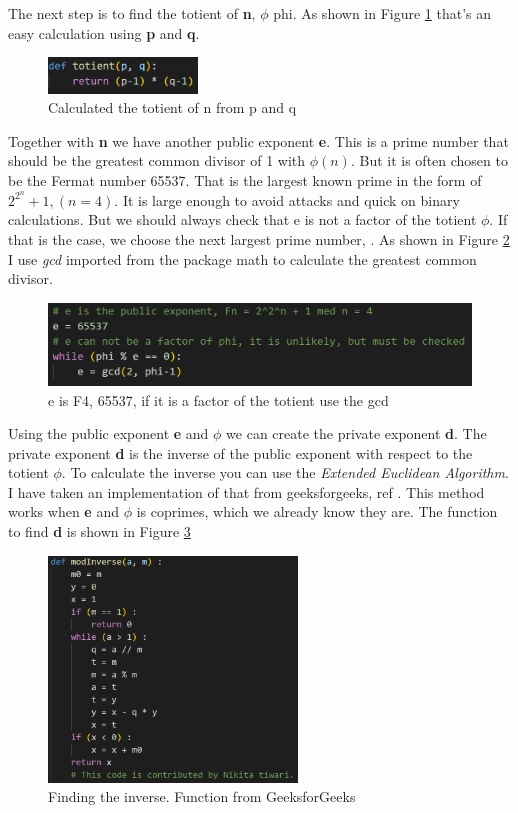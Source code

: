 \documentclass[12pt, letterpaper]{article}
\begin{document}
The next step is to find the totient of \textbf{n}, $\phi$ phi. As shown in Figure \ref{fig:totient} that's an easy calculation using \textbf{p} and \textbf{q}.

\begin{figure}[H]
  \includegraphics[width=150px]{code_snippets/totient.PNG}\centering
  \caption{Calculated the totient of n from p and q}
  \label{fig:totient}
\end{figure}

Together with \textbf{n} we have another public exponent \textbf{e}. This is a prime number that should be the greatest common divisor of 1 with $\phi(n)$. But it is often chosen to be the Fermat number 65537. That is the largest known prime in the form of $2^{2^{n}} + 1, (n=4)$. It is large enough to avoid attacks and quick on binary calculations. But we should always check that e is not a factor of the totient $\phi$. If that is the case, we choose the next largest prime number, \cite{65537}. As shown in Figure \ref{fig:e} I use \textit{gcd} imported from the package math to calculate the greatest common divisor.

\begin{figure}[H]
  \includegraphics[width=\linewidth]{code_snippets/e.PNG}\centering
  \caption{e is F4, 65537, if it is a factor of the totient use the gcd}
  \label{fig:e}
\end{figure}

Using the public exponent \textbf{e} and $\phi$ we can create the private exponent \textbf{d}. The private exponent \textbf{d} is the inverse of the public exponent with respect to the totient $\phi$. To calculate the inverse you can use the \textit{Extended Euclidean Algorithm}. I have taken an implementation of that from geeksforgeeks, ref \cite{modinv}. This method works when \textbf{e} and $\phi$ is coprimes, which we already know they are. The function to find \textbf{d} is shown in Figure \ref{fig:modinv}

\begin{figure}[H]
  \includegraphics[width=250px]{code_snippets/modinv.PNG}\centering
  \caption{Finding the inverse. Function from GeeksforGeeks}
  \label{fig:modinv}
\end{figure}
\end{document}
